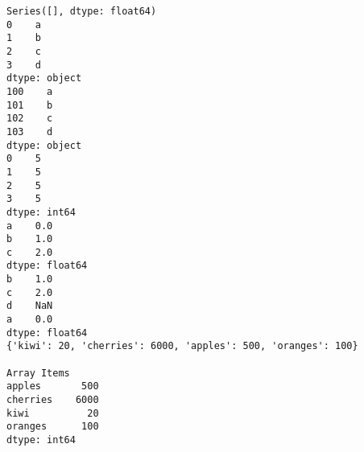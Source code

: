 \documentclass[11pt]{article}
\begin{document}
\begin{verbatim}
Series([], dtype: float64)
0    a
1    b
2    c
3    d
dtype: object
100    a
101    b
102    c
103    d
dtype: object
0    5
1    5
2    5
3    5
dtype: int64
a    0.0
b    1.0
c    2.0
dtype: float64
b    1.0
c    2.0
d    NaN
a    0.0
dtype: float64
{'kiwi': 20, 'cherries': 6000, 'apples': 500, 'oranges': 100}

Array Items
apples       500
cherries    6000
kiwi          20
oranges      100
dtype: int64
\end{verbatim}
\end{document}
